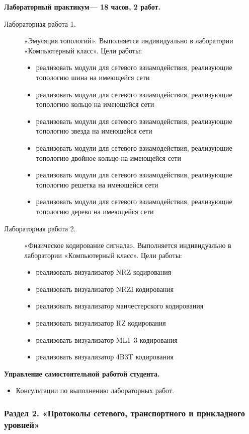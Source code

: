 \begin{center}
{\textbf{Лабораторный практикум— 18 часов, 2 работ.}
\begin{description}
\item[Лабораторная работа 1.] «Эмуляция топологий». Выполняется индивидуально в лаборатории «Компьютерный класс». Цели работы: \begin{itemize}
\item реализовать модули для сетевого взиамодействия, реализующие топологию шина на имеющейся сети\item реализовать модули для сетевого взиамодействия, реализующие топологию кольцо на имеющейся сети\item реализовать модули для сетевого взиамодействия, реализующие топологию звезда на имеющейся сети\item реализовать модули для сетевого взиамодействия, реализующие топологию двойное кольцо на имеющейся сети\item реализовать модули для сетевого взиамодействия, реализующие топологию решетка на имеющейся сети\item реализовать модули для сетевого взиамодействия, реализующие топологию дерево на имеющейся сети
\end{itemize}\item[Лабораторная работа 2.] «Физическое кодирование сигнала». Выполняется индивидуально в лаборатории «Компьютерный класс». Цели работы: \begin{itemize}
\item реализовать визуализатор NRZ кодирования\item реализовать визуализатор NRZI кодирования\item реализовать визуализатор манчестерского кодирования\item реализовать визуализатор RZ кодирования\item реализовать визуализатор MLT-3 кодирования\item реализовать визуализатор 4B3T кодирования
\end{itemize}
\end{description}

\textbf{Управление самостоятельной работой студента.}
\begin{itemize}
\item Консультации по выполнению лабораторных работ.
\end{itemize}
}


\subsubsection{Раздел 2. «Протоколы сетевого, транспортного и прикладного уровней»}


\end{center}
